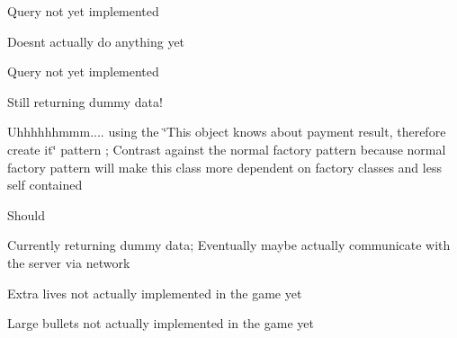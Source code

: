 \begin{DoxyRefList}
Query not yet implemented  
\item[\label{todo__todo000010}%
\Hypertarget{todo__todo000010}%
Member \hyperlink{classAsteroids_1_1Domain_1_1Server_1_1ServerDaemon_a0db3978640446e783c54932014d043cb}{Asteroids\+:\+:Domain\+:\+:Server\+:\+:Server\+Daemon\+:\+:forgive\+\_\+haccs\+\_\+report} (std\+::shared\+\_\+ptr$<$ H\+A\+C\+C\+S\+\_\+\+R\+E\+P\+O\+R\+T\+\_\+\+I\+N\+T\+E\+R\+F\+A\+C\+E $>$ report)]Doesn\textquotesingle{}t actually do anything yet 

Query not yet implemented  
\item[\label{todo__todo000009}%
\Hypertarget{todo__todo000009}%
Member \hyperlink{classAsteroids_1_1Domain_1_1Server_1_1ServerDaemon_a53548491d0700fffff3730f3c48525d6}{Asteroids\+:\+:Domain\+:\+:Server\+:\+:Server\+Daemon\+:\+:get\+\_\+next\+\_\+haccs\+\_\+report} ()]Still returning dummy data!  
\item[\label{todo__todo000014}%
\Hypertarget{todo__todo000014}%
Member \hyperlink{classAsteroids_1_1Domain_1_1Store_1_1PaymentHelper_a603cc23e44e6e3f760f05c3657bf81c5}{Asteroids\+:\+:Domain\+:\+:Store\+:\+:Payment\+Helper\+:\+:pay\+\_\+for\+\_\+store\+\_\+item\+\_\+with\+\_\+credit\+\_\+card} (std\+::shared\+\_\+ptr$<$ Asteroids\+::\+Domain\+::\+Store\+::\+S\+T\+O\+R\+E\+\_\+\+I\+T\+E\+M\+\_\+\+I\+N\+T\+E\+R\+F\+A\+C\+E $>$ item, std\+::string cc\+\_\+number, std\+::string cc\+\_\+expiration, std\+::string cc\+\_\+security\+\_\+code)]Uhhhhhhmmm.... using the \char`\"{}\+This object knows about payment result, therefore create it\char`\"{} pattern ; Contrast against the normal factory pattern because normal factory pattern will make this class more dependent on factory classes and less self contained  
\item[\label{todo__todo000015}%
\Hypertarget{todo__todo000015}%
Member \hyperlink{classAsteroids_1_1Domain_1_1Store_1_1Store_a6263ac0a86f49fb2ddf89c93d7cf9015}{Asteroids\+:\+:Domain\+:\+:Store\+:\+:Store\+:\+:get\+\_\+available\+\_\+store\+\_\+items} ()]Should 

Currently returning dummy data; Eventually maybe actually communicate with the server via network 

Extra lives not actually implemented in the game yet 

Large bullets not actually implemented in the game yet 


\end{DoxyRefList}
